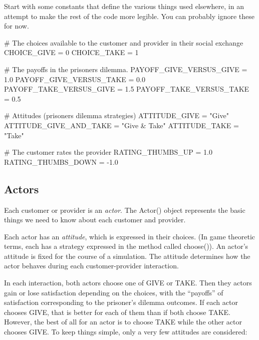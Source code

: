 \documentclass[
  letterpaper,
  DIV=11,
  numbers=noendperiod]{scrartcl}
\newenvironment{Shaded}{\begin{snugshade}}{\end{snugshade}}
\newcommand{\CommentTok}[1]{\textcolor[rgb]{0.37,0.37,0.37}{#1}}
\newcommand{\DecValTok}[1]{\textcolor[rgb]{0.68,0.00,0.00}{#1}}
\newcommand{\FloatTok}[1]{\textcolor[rgb]{0.68,0.00,0.00}{#1}}
\newcommand{\NormalTok}[1]{\textcolor[rgb]{0.00,0.23,0.31}{#1}}
\newcommand{\OperatorTok}[1]{\textcolor[rgb]{0.37,0.37,0.37}{#1}}
\newcommand{\StringTok}[1]{\textcolor[rgb]{0.13,0.47,0.30}{#1}}
\begin{document}
Start with some constants that define the various things used elsewhere,
in an attempt to make the rest of the code more legible. You can
probably ignore these for now.

\begin{Shaded}
\begin{Highlighting}[]
\CommentTok{\# The choices available to the customer and provider in their social exchange}
\NormalTok{CHOICE\_GIVE }\OperatorTok{=} \DecValTok{0}
\NormalTok{CHOICE\_TAKE }\OperatorTok{=} \DecValTok{1}

\CommentTok{\# The payoffs in the prisoner\textquotesingle{}s dilemma. }
\NormalTok{PAYOFF\_GIVE\_VERSUS\_GIVE }\OperatorTok{=} \FloatTok{1.0} 
\NormalTok{PAYOFF\_GIVE\_VERSUS\_TAKE }\OperatorTok{=} \FloatTok{0.0}
\NormalTok{PAYOFF\_TAKE\_VERSUS\_GIVE }\OperatorTok{=} \FloatTok{1.5}
\NormalTok{PAYOFF\_TAKE\_VERSUS\_TAKE }\OperatorTok{=} \FloatTok{0.5}

\CommentTok{\# Attitudes (prisoner\textquotesingle{}s dilemma strategies)}
\NormalTok{ATTITUDE\_GIVE }\OperatorTok{=} \StringTok{"Give"}
\NormalTok{ATTITUDE\_GIVE\_AND\_TAKE }\OperatorTok{=} \StringTok{"Give \& Take"}
\NormalTok{ATTITUDE\_TAKE }\OperatorTok{=} \StringTok{"Take"}

\CommentTok{\# The customer rates the provider}
\NormalTok{RATING\_THUMBS\_UP }\OperatorTok{=} \FloatTok{1.0}
\NormalTok{RATING\_THUMBS\_DOWN }\OperatorTok{=} \OperatorTok{{-}}\FloatTok{1.0}
\end{Highlighting}
\end{Shaded}

\hypertarget{actors}{%
\subsection{Actors}\label{actors}}

Each customer or provider is an \emph{actor}. The Actor() object
represents the basic things we need to know about each customer and
provider.

Each actor has an \emph{attitude}, which is expressed in their choices.
(In game theoretic terms, each has a strategy expressed in the method
called choose()). An actor's attitude is fixed for the course of a
simulation. The attitude determines how the actor behaves during each
customer-provider interaction.

In each interaction, both actors choose one of GIVE or TAKE. Then they
actors gain or lose satisfaction depending on the choices, with the
``payoffs'' of satisfaction corresponding to the prisoner's dilemma
outcomes. If each actor chooses GIVE, that is better for each of them
than if both choose TAKE. However, the best of all for an actor is to
choose TAKE while the other actor chooses GIVE. To keep things simple,
only a very few attitudes are considered:
\end{document}
